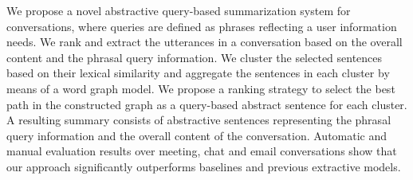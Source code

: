 We propose a novel abstractive query-based summarization system for conversations, where queries are defined as phrases reflecting a user information needs. We rank and extract the utterances in a conversation based on the overall content and the phrasal query information. We cluster the selected sentences based on their lexical similarity and aggregate the sentences in each cluster by means of a word graph model. We propose a ranking strategy to select the best path in the constructed graph as a query-based abstract sentence for each cluster. A resulting summary consists of abstractive sentences representing the phrasal query information and the overall content of the conversation. Automatic and manual evaluation results over meeting, chat and email conversations show that our approach significantly outperforms baselines and previous extractive models.

